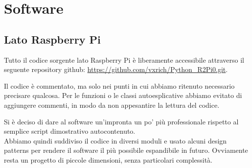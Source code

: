 \documentclass[12pt]{article}
\newcommand{\raspi}{Raspberry Pi}
\begin{document}
\section{Software}

\subsection{Lato \raspi}

\begin{minipage}{\linewidth}
Tutto il codice sorgente lato \raspi{} è liberamente accessibile attraverso il seguente repository github:  \url{https://github.com/vxrich/Python_R2Pi0.git}.
\end{minipage}

Il codice è commentato, ma solo nei punti in cui abbiamo ritenuto necessario precisare qualcosa. Per le funzioni o le classi autoesplicative abbiamo evitato di aggiungere commenti, in modo da non appesantire la lettura del codice.

Si è deciso di dare al software un'impronta un po' più professionale rispetto al semplice script dimostrativo autocontenuto.\\
Abbiamo quindi suddiviso il codice in diversi moduli e usato alcuni design patterns per rendere il software il più possibile espandibile in futuro. Ovviamente resta un progetto di piccole dimensioni, senza particolari complessità.
\end{document}
